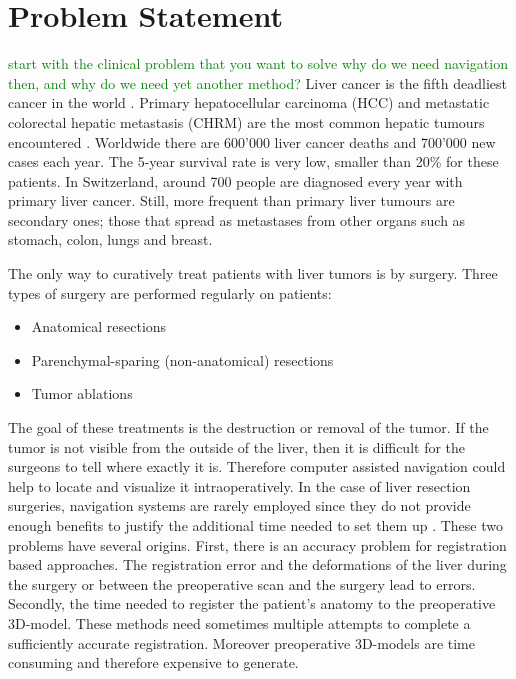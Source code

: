 \chapter{Problem Statement}
\textcolor{green}{start with the clinical problem that you want to solve}
\textcolor{green}{why do we need navigation then, and why do we need yet another method?}
Liver cancer is the fifth deadliest cancer in the world \cite{bray2018global}.
Primary hepatocellular carcinoma (HCC) and metastatic colorectal hepatic
metastasis (CHRM) are the most common hepatic tumours encountered \cite{north2014microwave}. Worldwide
there are 600'000 liver cancer deaths and 700'000 new cases each year.
The 5-year survival rate is very low, smaller than 20\% for these
patients. In Switzerland, around 700 people are diagnosed every year with
primary liver cancer. Still, more frequent than primary liver tumours are
secondary ones; those that spread as metastases from other organs such as stomach, colon,
lungs and breast. 

The only way to curatively treat patients with liver tumors is by surgery. Three types of surgery
are performed regularly on patients:
\begin{itemize}
  \item Anatomical resections
  \item Parenchymal-sparing (non-anatomical) resections
  \item Tumor ablations 
\end{itemize}
The goal of these treatments is the destruction or removal of the tumor. If the
tumor is not visible from the outside of the liver, then it is difficult for the
surgeons to tell where exactly it is. Therefore computer assisted navigation
could help to locate and visualize it intraoperatively.
In the case of liver resection surgeries, navigation systems are rarely employed
since they do not provide enough benefits to justify the additional time needed
to set them up \cite{beller2007image}. These two problems have several origins.
First, there is an accuracy problem for registration based approaches. The
registration error and the deformations of the liver during the surgery
\cite{clements2017deformation} or between the preoperative scan and the surgery
lead to errors. Secondly, the time needed to register the patient's anatomy to the
preoperative 3D-model. These methods need sometimes multiple attempts to complete
a sufficiently accurate registration. Moreover preoperative 3D-models are time
consuming and therefore expensive to generate.

